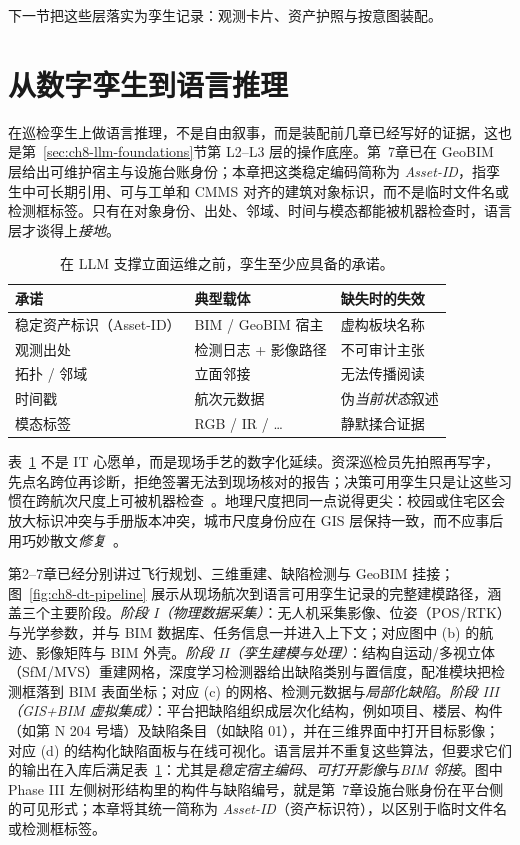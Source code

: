 下一节把这些层落实为孪生记录：观测卡片、资产护照与按意图装配。

\section{从数字孪生到语言推理}
\label{sec:ch8-dt-to-language}

在巡检孪生上做语言推理，不是自由叙事，而是装配前几章已经写好的证据，这也是第~\ref{sec:ch8-llm-foundations}节第 L2--L3 层的操作底座。第~7章已在 GeoBIM 层给出可维护宿主与设施台账身份；本章把这类稳定编码简称为 \emph{Asset-ID}，指孪生中可长期引用、可与工单和 CMMS 对齐的建筑对象标识，而不是临时文件名或检测框标签。只有在对象身份、出处、邻域、时间与模态都能被机器检查时，语言层才谈得上\emph{接地}。

\begin{table}[htbp]
\centering
\caption{在 LLM 支撑立面运维之前，孪生至少应具备的承诺。}
\label{tab:ch8-twin-contract}
\begin{tabular}{llp{5.4cm}}
\toprule
承诺 & 典型载体 & 缺失时的失效 \\
\midrule
稳定资产标识（Asset-ID） & BIM / GeoBIM 宿主 & 虚构板块名称 \\
观测出处 & 检测日志 + 影像路径 & 不可审计主张 \\
拓扑 / 邻域 & 立面邻接 & 无法传播阅读 \\
时间戳 & 航次元数据 & 伪\emph{当前状态}叙述 \\
模态标签 & RGB / IR / \ldots & 静默揉合证据 \\
\bottomrule
\end{tabular}
\end{table}

表~\ref{tab:ch8-twin-contract} 不是 IT 心愿单，而是现场手艺的数字化延续。资深巡检员先拍照再写字，先点名跨位再诊断，拒绝签署无法到现场核对的报告；决策可用孪生只是让这些习惯在跨航次尺度上可被机器检查~\cite{zhang2022,chen2023facility}。地理尺度把同一点说得更尖：校园或住宅区会放大标识冲突与手册版本冲突，城市尺度身份应在 GIS 层保持一致，而不应事后用巧妙散文\emph{修复}~\cite{zhang2025,han2025}。

第2--7章已经分别讲过飞行规划、三维重建、缺陷检测与 GeoBIM 挂接；图~\ref{fig:ch8-dt-pipeline} 展示从现场航次到语言可用孪生记录的完整建模路径，涵盖三个主要阶段。\emph{阶段 I（物理数据采集）}：无人机采集影像、位姿（POS/RTK）与光学参数，并与 BIM 数据库、任务信息一并进入上下文；对应图中 (b) 的航迹、影像矩阵与 BIM 外壳。\emph{阶段 II（孪生建模与处理）}：结构自运动/多视立体（SfM/MVS）重建网格，深度学习检测器给出缺陷类别与置信度，配准模块把检测框落到 BIM 表面坐标；对应 (c) 的网格、检测元数据与\emph{局部化缺陷}。\emph{阶段 III（GIS+BIM 虚拟集成）}：平台把缺陷组织成层次化结构，例如项目、楼层、构件（如第 N 204 号墙）及缺陷条目（如缺陷 01），并在三维界面中打开目标影像；对应 (d) 的结构化缺陷面板与在线可视化。语言层并不重复这些算法，但要求它们的输出在入库后满足表~\ref{tab:ch8-twin-contract}：尤其是\emph{稳定宿主编码}、\emph{可打开影像}与\emph{BIM 邻接}。图中 Phase III 左侧树形结构里的构件与缺陷编号，就是第~7章设施台账身份在平台侧的可见形式；本章将其统一简称为 \emph{Asset-ID}（资产标识符），以区别于临时文件名或检测框标签。

